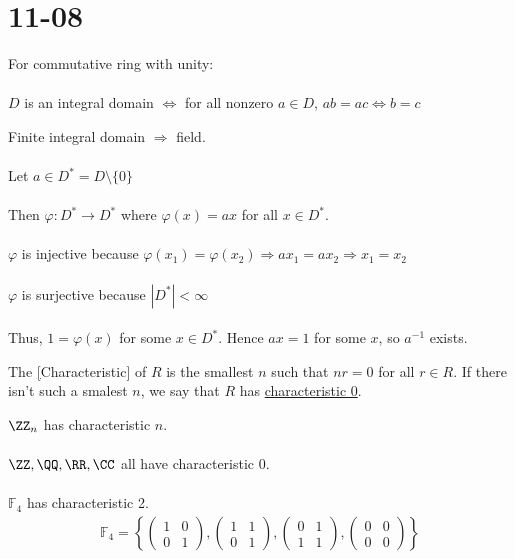 \documentclass[class=scrartcl, crop=false]{standalone}
\date{2019-11-08}
\begin{document}
\section{11-08}

\begin{proposition}[16.15]
  For commutative ring with unity:
  \\\\
  $D$ is an integral domain $\Leftrightarrow$ for all nonzero $a \in D$, $ab = ac \Leftrightarrow b = c$
\end{proposition} 

\begin{theorem}[16.16]
  Finite integral domain $\Rightarrow$ field.
  \\\\
  Let $a \in D^* = D \setminus \{0\}$
  \\\\
  Then $\varphi:D^* \to D^*$ where  $\varphi(x) = ax$ for all $x \in D^*$.
  \\\\
  $\varphi$ is injective because $\varphi(x_1) = \varphi(x_2) \Rightarrow ax_1 = ax_2 \Rightarrow x_1 = x_2$ 
  \\\\
  $\varphi$ is surjective because $|D^*| < \infty$ 
  \\\\
  Thus, $1 = \varphi(x)$ for some $x \in D^*$. Hence $ax = 1$ for some $x$, so $a^{-1}$ exists.
\end{theorem} 

\begin{definition}
  The \ul[Characteristic] of $R$ is the smallest  $n$ such that $nr = 0$ for all $r \in R$. If there isn't such a smalest $n$, we say that $R$ has \ul{characteristic 0}.
\end{definition} 

\begin{example}
  $\ZZ_n$ has characteristic $n$.
  \\\\
  $\ZZ, \QQ, \RR, \CC$ all have characteristic 0.
  \\\\
  $\mathbb{F}_4$ has characteristic 2.
  \begin{gather*}
    \mathbb{F}_4 = 
    \left\{
      \begin{pmatrix}
        1 & 0 \\
        0 & 1
      \end{pmatrix} ,
      \begin{pmatrix}
        1 & 1 \\
        0 & 1
      \end{pmatrix} ,
      \begin{pmatrix}
        0 & 1 \\
        1 & 1
      \end{pmatrix} ,
      \begin{pmatrix}
        0 & 0 \\
        0 & 0
      \end{pmatrix} 
    \right\}
  \end{gather*} 
\end{example} 
\end{document}
